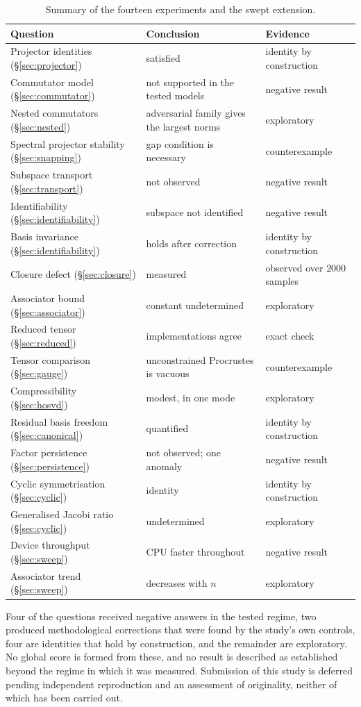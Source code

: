 \documentclass[11pt]{amsart}
\theoremstyle{remark}
\begin{document}
\begin{table}[h]
\centering\small
\caption{Summary of the fourteen experiments and the swept extension.}
\label{tab:summary}
\begin{tabularx}{\linewidth}{@{}lXl@{}}
\toprule
Question & Conclusion & Evidence \\
\midrule
Projector identities (\S\ref{sec:projector}) & satisfied & identity by construction \\
Commutator model (\S\ref{sec:commutator}) & not supported in the tested models & negative result \\
Nested commutators (\S\ref{sec:nested}) & adversarial family gives the largest norms & exploratory \\
Spectral projector stability (\S\ref{sec:snapping}) & gap condition is necessary & counterexample \\
Subspace transport (\S\ref{sec:transport}) & not observed & negative result \\
Identifiability (\S\ref{sec:identifiability}) & subspace not identified & negative result \\
Basis invariance (\S\ref{sec:identifiability}) & holds after correction & identity by construction \\
Closure defect (\S\ref{sec:closure}) & measured & observed over $2000$ samples \\
Associator bound (\S\ref{sec:associator}) & constant undetermined & exploratory \\
Reduced tensor (\S\ref{sec:reduced}) & implementations agree & exact check \\
Tensor comparison (\S\ref{sec:gauge}) & unconstrained Procrustes is vacuous & counterexample \\
Compressibility (\S\ref{sec:hosvd}) & modest, in one mode & exploratory \\
Residual basis freedom (\S\ref{sec:canonical}) & quantified & identity by construction \\
Factor persistence (\S\ref{sec:persistence}) & not observed; one anomaly & negative result \\
Cyclic symmetrisation (\S\ref{sec:cyclic}) & identity & identity by construction \\
Generalised Jacobi ratio (\S\ref{sec:cyclic}) & undetermined & exploratory \\
Device throughput (\S\ref{sec:sweep}) & CPU faster throughout & negative result \\
Associator trend (\S\ref{sec:sweep}) & decreases with $n$ & exploratory \\
\bottomrule
\end{tabularx}
\end{table}

Four of the questions received negative answers in the tested regime, two produced
methodological corrections that were found by the study's own controls, four are identities
that hold by construction, and the remainder are exploratory. No global score is formed from
these, and no result is described as established beyond the regime in which it was measured.
Submission of this study is deferred pending independent reproduction and an assessment of
originality, neither of which has been carried out.



\end{document}
